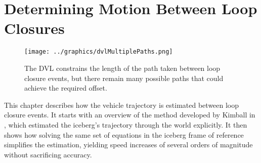 
\chapter{Determining Motion Between Loop Closures}
\label{ch.IcebergGeometry}

\begin{figure}[htbp]
   \centering
   \texttt{[image: ../graphics/dvlMultiplePaths.png]} %
   \caption{The DVL constrains the length of the path taken between loop closure events, but there remain many possible paths that could achieve the required offset.}
   \label{fig:MultiPath}
\end{figure}

This chapter describes how the vehicle trajectory is estimated between loop closure events. It starts with an overview of the method developed by Kimball in \cite{Kimball2011b}, which estimated the iceberg's trajectory through the world explicitly. It then shows how solving the same set of equations in the iceberg frame of reference simplifies the estimation, yielding speed increases of several orders of magnitude without sacrificing accuracy.





